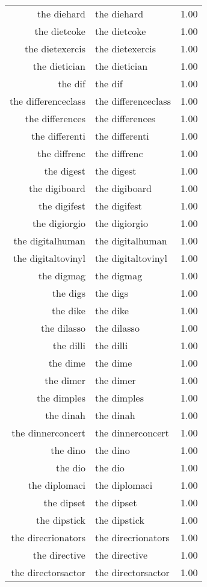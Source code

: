 \begin{table}[ht]
\begin{tabular}{rlr}
  the diehard & the diehard & 1.00 \\ 
  the dietcoke & the dietcoke & 1.00 \\ 
  the dietexercis & the dietexercis & 1.00 \\ 
  the dietician & the dietician & 1.00 \\ 
  the dif & the dif & 1.00 \\ 
  the differenceclass & the differenceclass & 1.00 \\ 
  the differences & the differences & 1.00 \\ 
  the differenti & the differenti & 1.00 \\ 
  the diffrenc & the diffrenc & 1.00 \\ 
  the digest & the digest & 1.00 \\ 
  the digiboard & the digiboard & 1.00 \\ 
  the digifest & the digifest & 1.00 \\ 
  the digiorgio & the digiorgio & 1.00 \\ 
  the digitalhuman & the digitalhuman & 1.00 \\ 
  the digitaltovinyl & the digitaltovinyl & 1.00 \\ 
  the digmag & the digmag & 1.00 \\ 
  the digs & the digs & 1.00 \\ 
  the dike & the dike & 1.00 \\ 
  the dilasso & the dilasso & 1.00 \\ 
  the dilli & the dilli & 1.00 \\ 
  the dime & the dime & 1.00 \\ 
  the dimer & the dimer & 1.00 \\ 
  the dimples & the dimples & 1.00 \\ 
  the dinah & the dinah & 1.00 \\ 
  the dinnerconcert & the dinnerconcert & 1.00 \\ 
  the dino & the dino & 1.00 \\ 
  the dio & the dio & 1.00 \\ 
  the diplomaci & the diplomaci & 1.00 \\ 
  the dipset & the dipset & 1.00 \\ 
  the dipstick & the dipstick & 1.00 \\ 
  the direcrionators & the direcrionators & 1.00 \\ 
  the directive & the directive & 1.00 \\ 
  the directorsactor & the directorsactor & 1.00 \\ 

\end{tabular}
\end{table}
